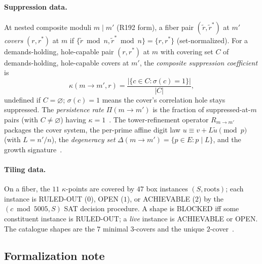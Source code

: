 \documentclass[11pt,a4paper]{article}
\theoremstyle{definition}
\begin{document}
\paragraph{Suppression data.}
At nested composite moduli $m\mid m'$ (R192 form), a fiber pair
$(\tilde r,\tilde r^*)$ at $m'$ \emph{covers} $(r,r^*)$ at $m$ if
$\{\tilde r\bmod n,\tilde r^*\bmod n\}=\{r,r^*\}$ (set-normalized).
For a demands-holding, hole-capable pair $(r,r^*)$ at $m$ with covering
set $C$ of demands-holding, hole-capable covers at $m'$, the
\emph{composite suppression coefficient} is
\begin{equation}
  \label{eq:kappa}
  \kappa(m\to m',r)=\frac{|\{c\in C:\sigma(c)=1\}|}{|C|},
\end{equation}
undefined if $C=\varnothing$; $\sigma(c)=1$ means the cover's correlation
hole stays suppressed. The \emph{persistence rate}
$\Pi(m\to m')$ is the fraction of suppressed-at-$m$ pairs (with $C\ne
\varnothing$) having $\kappa=1$~\cite{D205}. The tower-refinement operator
$R_{m\to m'}$ packages the cover system, the per-prime affine digit law
$u\equiv v+L\tilde u\pmod p$ (with $L=n'/n$), the \emph{degeneracy set}
$\Delta(m\to m')=\{p\in E:p\mid L\}$, and the growth
signature~\cite{D207}.

\paragraph{Tiling data.}
On a fiber, the $11$ $\kappa$-points are covered by $47$ box instances
$(S,\mathrm{roots})$; each instance is RULED-OUT ($0$), OPEN ($1$), or
ACHIEVABLE ($2$) by the $(c\bmod5005,S)$ SAT decision procedure. A shape
is BLOCKED iff some constituent instance is RULED-OUT; a \emph{live}
instance is ACHIEVABLE or OPEN. The catalogue shapes are the $7$ minimal
$3$-covers and the unique $2$-cover~\cite{D193}.

\subsection{Formalization note}
\end{document}
